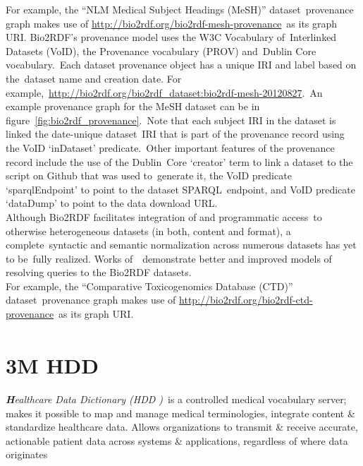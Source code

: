 \documentclass[DIV=calc, paper=a4, fontsize=12pt, onecolumn]{scrartcl}	 %
\newcommand{\initial}[1]{ %
\lettrine[lines=3,lhang=0.3,nindent=0em,slope=0em]{
\color{DarkBlue}
{\textbf{\textit{#1}}}}{}}
\begin{document}
  \noindent For example, the ``NLM Medical Subject Headings (MeSH)'' dataset\
  provenance graph makes use of \url{http://bio2rdf.org/bio2rdf-mesh-provenance}\
  as its graph URI. Bio2RDF's provenance model uses the W3C Vocabulary of\
  Interlinked Datasets (VoID), the Provenance vocabulary (PROV) and\
  Dublin Core vocabulary.\
  Each dataset provenance object has a unique IRI and label based on the\
  dataset name and creation date. For example,\
  \url{http://bio2rdf.org/bio2rdf_dataset:bio2rdf-mesh-20120827}.\
  An example provenance graph for the MeSH dataset can be in figure~\ref{fig:bio2rdf_provenance}.\
  Note that each subject IRI in the dataset is linked the date-unique dataset\
  IRI that is part of the provenance record using the VoID `inDataset' predicate.\
  Other important features of the provenance record include the use of the Dublin\
  Core `creator' term to link a dataset to the script on Github that was used to\
  generate it, the VoID predicate `sparqlEndpoint' to point to the dataset SPARQL\
  endpoint, and VoID predicate `dataDump' to point to the data download URL.\\
  
  \noindent Although Bio2RDF facilitates integration of and programmatic access\
  to otherwise heterogeneous datasets (in both, content and format), a complete\
  syntactic and semantic normalization across numerous datasets has yet to be\
  fully realized. Works of~\citep{ansell_model_2011, callahan_ontology-based_2013}\
  demonstrate better and improved models of resolving queries to the Bio2RDF datasets.\\
  For example, the ``Comparative Toxicogenomics Database (CTD)'' dataset\
  provenance graph makes use of \url{http://bio2rdf.org/bio2rdf-ctd-provenance}\
  as its graph URI.



\section[3M\textsuperscript{\texttrademark} Healthcare Data Dictionary (HDD)]
{3M HDD\textsuperscript{\texttrademark}}
  \label{sec:hdd}
  
  \initial{H}\textit{ealthcare Data Dictionary (HDD )}\
 is a controlled medical vocabulary server; makes it possible to map and manage medical terminologies, integrate content \& standardize healthcare data. Allows organizations to transmit \& receive accurate, actionable patient data across systems \& applications, regardless of where data originates%
  
\end{document}
